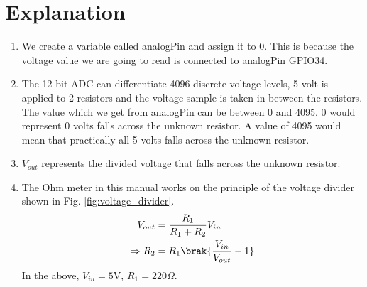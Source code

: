 \documentclass[journal,12pt,twocolumn]{IEEEtran}
\renewcommand\thesection{\arabic{section}}
\begin{document}
\section{Explanation}
\begin{enumerate}[label=\thesection.\arabic*.,ref=\thesection.\theenumi]


\item We create a variable called analogPin and assign it to 0. 
This is because the voltage value we are going to read is connected to analogPin GPIO34.

\item  The 12-bit ADC can differentiate 4096 discrete voltage levels, 5 volt is applied to 2 resistors and the voltage sample is taken in between the resistors. The value which we get from analogPin can be between 0 and 4095. 0 would represent 0 volts falls across the unknown resistor. A value of 4095 would mean that practically all 5 volts falls across the unknown resistor.

\item  $V_{out}$ represents the divided voltage that falls across the unknown resistor.

\item  The Ohm meter in this manual works on the principle of the voltage divider shown in Fig. \ref{fig:voltage_divider}.
%
\begin{align}
V_{out}&=\frac{R_1}{R_1+R_2}V_{in} \\
\Rightarrow R_2&=R_1\brak{\frac{V_{in}}{V_{out}}-1}
\end{align}
%
In the above, $V_{in} = 5$V, $R_1 = 220 \Omega$.
\end{enumerate}
\end{document}
